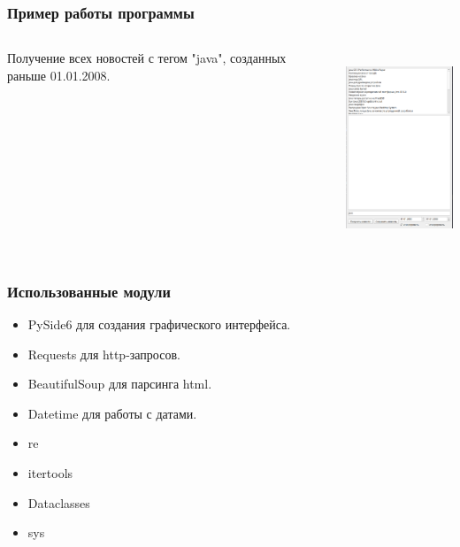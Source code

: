 \documentclass[aspectratio=169,12pt]{beamer}
\begin{document}
\begin{frame}
    \frametitle{Пример работы программы}
    \begin{columns}
        \begin{column}{0.34\textwidth}
            Получение всех новостей с тегом "java", созданных раньше 01.01.2008.
        \end{column}
        \begin{column}{0.56 \textwidth}
            \includegraphics[width = \textwidth,height=220]{java2008.png}
        \end{column}
    \end{columns}
\end{frame}
\begin{frame}
    \frametitle{Использованные модули}
    \begin{itemize}
        \item PySide6 для создания графического интерфейса.
        \item Requests для  http-запросов.
        \item BeautifulSoup для парсинга html.
        \item Datetime для работы с датами.
        \item re
        \item itertools
        \item Dataclasses
        \item sys
    \end{itemize}
\end{frame}
\end{document}
